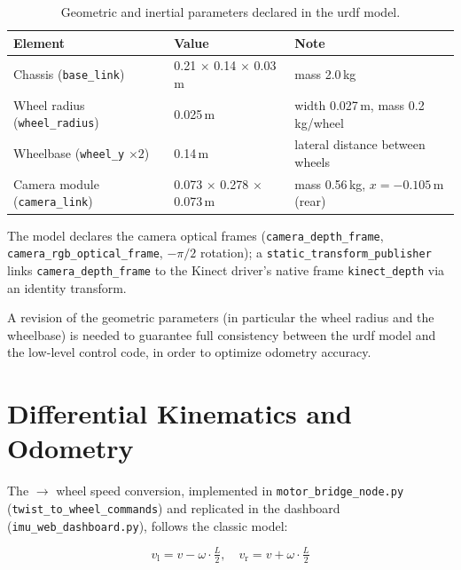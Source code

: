 \begin{table}[H]
	\centering
	\caption{Geometric and inertial parameters declared in the \gls{urdf} model.}
	\label{tab:urdf_geom}
	\begin{tabularx}{\linewidth}{L{5cm} C{3.2cm} L{5cm}}
		\toprule
		\textbf{Element} & \textbf{Value} & \textbf{Note} \\
		\midrule
		Chassis (\texttt{base\_link}) & 0.21 $\times$ 0.14 $\times$ 0.03\,m & mass 2.0\,kg \\
		Wheel radius (\texttt{wheel\_radius}) & 0.025\,m & width 0.027\,m, mass 0.2\,kg/wheel \\
		Wheelbase (\texttt{wheel\_y} $\times 2$) & 0.14\,m & lateral distance between wheels \\
		Camera module (\texttt{camera\_link}) & 0.073 $\times$ 0.278 $\times$ 0.073\,m & mass 0.56\,kg, $x=-0.105$\,m (rear) \\
		\bottomrule
	\end{tabularx}
\end{table}

The model declares the camera optical frames (\texttt{camera\_depth\_frame},
\texttt{camera\_rgb\_optical\_frame}, $-\pi/2$ rotation); a
\texttt{static\_transform\_publisher} links \texttt{camera\_depth\_frame} to the Kinect
driver's native frame \texttt{kinect\_depth} via an identity transform.

\begin{warnbox}
	A revision of the geometric parameters (in particular the wheel radius and the
	wheelbase) is needed to guarantee full consistency between the \gls{urdf} model and
	the low-level control code, in order to optimize odometry accuracy.
\end{warnbox}

\section{Differential Kinematics and Odometry}
\label{sec:meca_kinematics}

The  $\to$ wheel speed conversion, implemented in
\texttt{motor\_bridge\_node.py} (\texttt{twist\_to\_wheel\_\allowbreak commands}) and
replicated in the dashboard (\texttt{imu\_web\_dashboard.py}), follows the classic
model:

\begin{equation}
	v_{\text{l}} = v - \omega \cdot \tfrac{L}{2}, \quad
	v_{\text{r}} = v + \omega \cdot \tfrac{L}{2}
	\label{eq:diff_drive}
\end{equation}

